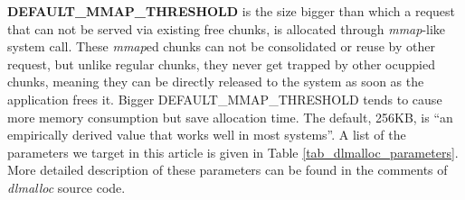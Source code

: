 
\textbf{DEFAULT\_MMAP\_THRESHOLD} is the size bigger than which a request that can not be served via existing free chunks, is allocated through \emph{mmap}-like system call. These \emph{mmap}ed chunks can not be consolidated or reuse by other request, but unlike regular chunks, they never get trapped by other ocuppied chunks, meaning they can be directly released to the system as soon as the application frees it. Bigger DEFAULT\_MMAP\_THRESHOLD tends to cause more memory consumption but save allocation time. The default, 256KB, is ``an empirically derived value that works well in most systems''. A list of the parameters we target in this article is given in Table \ref{tab_dlmalloc_parameters}. More detailed description of these parameters can be found in the comments of \emph{dlmalloc} source code.


